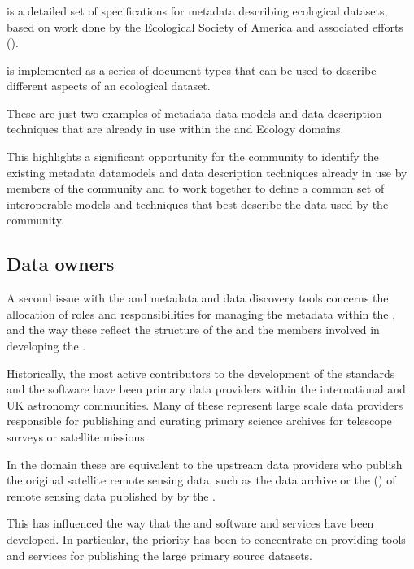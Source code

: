 \documentclass{article}
\begin{document}
\subsubsection{}

\cite{eml} is a detailed set of
specifications for metadata describing ecological datasets, based on
work done by the Ecological Society of America and associated efforts
 (\cite{michener-1997}).

\cite{eml} is implemented as a series of \cite{format-xml} document types
that can be used to describe different aspects of an ecological dataset.

These are just two examples of metadata data models and data description
techniques that are already in use within the \cite{gis} and Ecology domains.

This highlights a significant opportunity for the \cite{trop} community to
identify the existing metadata datamodels and data description techniques
already in use by members of the \cite{trop} community and to work together
to define a common set of interoperable models and techniques that best
describe the data used by the \cite{trop} community.

\subsection{Data owners}

A second issue with the \cite{ivoa} and \cite{astro} metadata \cite{ivoa-reg}
and data discovery tools concerns the allocation of roles and responsibilities
for managing the metadata within the \cite{ivoa-reg}, and the way these
reflect the structure of the \cite{ivoa} and the members involved in
developing the \cite{ivoa-reg}.

Historically, the most active contributors to the development of the
\cite{ivoa} standards and the \cite{astro} software have been primary data
providers within the international and UK astronomy communities.
Many of these represent large scale data providers responsible for
publishing and curating primary science archives for telescope surveys or
satellite missions.

In the \cite{trop} domain these are equivalent to the upstream data
providers who publish the original satellite remote sensing data, such as the
\cite{landsat} data archive or the  (\cite{usgs-lta})
of remote sensing data published by by the \cite{usgs}.

This has influenced the way that the \cite{ivoa} and \cite{astro} software
and services have been developed. In particular, the priority has been
to concentrate on providing tools and
services for publishing the large primary source datasets.
\end{document}
